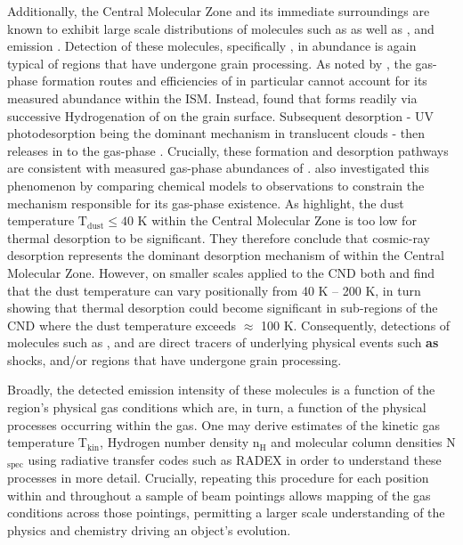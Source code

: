 \documentclass[twocolumn]{aastex631}
\begin{document}
Additionally, the Central Molecular Zone and its immediate surroundings are known to exhibit large scale distributions of molecules such as  \citep{GCRMethanol} as well as ,  and  emission \citep{CMZLineSurvey}. Detection of these molecules, specifically , in abundance is again typical of regions that have undergone grain processing. As noted by \citet{ch3ohFormation}, the gas-phase formation routes and efficiencies of  in particular cannot account for its measured abundance within the ISM. Instead, \citet{ch3ohFormation} found that  forms readily via successive Hydrogenation of  on the grain surface. Subsequent desorption - UV photodesorption being the dominant mechanism in translucent clouds - then releases  in to the gas-phase \citep{ch3ohFormation}. Crucially, these formation and desorption pathways are consistent with measured gas-phase abundances of . \citet{galacticCenterCosmicRays} also investigated this phenomenon by comparing chemical models to  observations to constrain the mechanism responsible for its gas-phase existence. As \citet{galCenDustTemp} highlight, the dust temperature $\mathrm{T_{dust}} \leq 40$ \si{\kelvin} within the Central Molecular Zone is too low for thermal desorption to be significant. They therefore conclude that cosmic-ray desorption represents the dominant desorption mechanism of  within the Central Molecular Zone. However, on smaller scales applied to the CND both \citet{galCenKuiper} and \citet{Lau_2013} find that the dust temperature can vary positionally from 40 \si{\kelvin} -- 200 \si{\kelvin}, in turn showing that thermal desorption could become significant in sub-regions of the CND where the dust temperature exceeds $\approx$ 100 \si{\kelvin}. Consequently, detections of molecules such as ,  and  are direct tracers of underlying physical events such \textbf{as} shocks, and/or regions that have undergone grain processing. 

Broadly, the detected emission intensity of these molecules is a function of the region's physical gas conditions which are, in turn, a function of the physical processes occurring within the gas. One may derive estimates of the kinetic gas temperature T$_\mathrm{kin}$, Hydrogen number density n$_{\mathrm{H}}$ and molecular column densities N$_{\mathrm{spec}}$ using radiative transfer codes such as RADEX \citep{radex} in order to understand these processes in more detail. Crucially, repeating this procedure for each position within and throughout a sample of beam pointings allows mapping of the gas conditions across those pointings, permitting a larger scale understanding of the physics and chemistry driving an object's evolution. 
\end{document}
